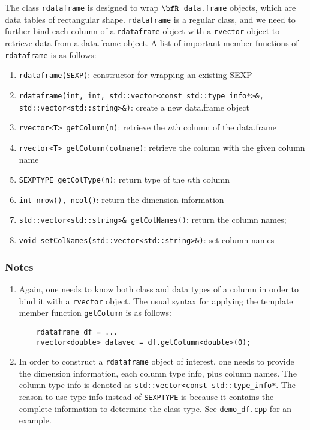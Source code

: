 \documentclass{article}
\newcommand{\R}{$\bfR$}
\begin{document}
The class \texttt{rdataframe} is designed to wrap \R\
\texttt{data.frame} objects, which are data tables of
rectangular shape. \texttt{rdataframe} is a regular class,
and we need to further bind each column of a
\texttt{rdataframe} object with a \texttt{rvector} object to
retrieve data from a data.frame object.  A list of important
member functions of \texttt{rdataframe} is as follows:
\begin{enumerate}
  \item \texttt{rdataframe(SEXP)}: constructor for wrapping
    an existing SEXP
  \item \texttt{rdataframe(int, int, std::vector<const
    std::type\_info*>\&, std::vector<std::string>\&)}: create
    a new data.frame object
  \item \texttt{rvector<T> getColumn(n)}: retrieve the $n$th
    column of the data.frame
  \item \texttt{rvector<T> getColumn(colname)}: retrieve the
    column with the given column name
  \item \texttt{SEXPTYPE getColType(n)}: return type of the $n$th column

  \item \texttt{int nrow(), ncol()}: return the dimension information
  \item \texttt{std::vector<std::string>\& getColNames()}:
    return the column names;
  \item \texttt{void setColNames(std::vector<std::string>\&)}: set column names
\end{enumerate}

\subsubsection*{Notes}
\begin{enumerate}
  \item Again, one needs to know both class and data types of
    a column in order to bind it with a \texttt{rvector}
    object. The usual syntax for applying the template member
    function \texttt{getColumn} is as follows:
    \begin{lstlisting}
    rdataframe df = ...
    rvector<double> datavec = df.getColumn<double>(0);
    \end{lstlisting}
  \item In order to construct a \texttt{rdataframe} object of
    interest, one needs to provide the dimension information,
    each column type info, plus column names. The column type
    info is denoted as \texttt{std::vector<const
    std::type\_info*}. The reason to use type info instead of
    \texttt{SEXPTYPE} is because it contains the complete information
    to determine the class type. See \texttt{demo\_df.cpp}
    for an example.
\end{enumerate}
\end{document}

